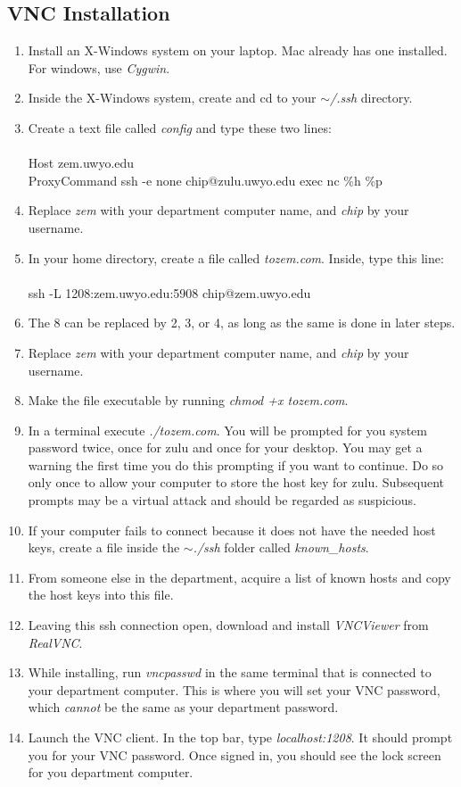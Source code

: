 \documentclass[letterpaper,12pt]{article}
\begin{document}
	\subsection{VNC Installation}
	\begin{enumerate}
		\item Install an X-Windows system on your laptop. Mac already has one installed. For windows, use \textit{Cygwin}.
		\item Inside the X-Windows system, create and cd to your \textit{$\sim$/.ssh} directory.
		\item Create a text file called \textit{config} and type these two lines:\\\\
			Host zem.uwyo.edu\\
			\hspace*{1ex} ProxyCommand ssh -e none chip@zulu.uwyo.edu exec nc \%h \%p
		\item Replace \textit{zem} with your department computer name, and \textit{chip} by your username.
		\item In your home directory, create a file called \textit{tozem.com}. Inside, type this line:\\\\
			ssh -L 1208:zem.uwyo.edu:5908 chip@zem.uwyo.edu

		\item The 8 can be replaced by 2, 3, or 4, as long as the same is done in later steps.
		\item Replace \textit{zem} with your department computer name, and \textit{chip} by your username.
		\item Make the file executable by running \textit{chmod +x tozem.com}.
		\item In a terminal execute \textit{./tozem.com}. You will be prompted for you system password twice, once for zulu and once for your desktop. You may get a warning the first time you do this prompting if you want to continue. Do so only once to allow your computer to store the host key for zulu. Subsequent prompts may be a virtual attack and should be regarded as suspicious.
		\item If your computer fails to connect because it does not have the needed host keys, create a file inside the \textit{$\sim$./ssh} folder called \textit{known\_hosts}.
		\item From someone else in the department, acquire a list of known hosts and copy the host keys into this file.
		\item Leaving this ssh connection open, download and install \textit{VNCViewer} from \textit{RealVNC}.
		\item While installing, run \textit{vncpasswd} in the same terminal that is connected to your department computer. This is where you will set your VNC password, which \textit{cannot} be the same as your department password.
		\item Launch the VNC client. In the top bar, type \textit{localhost:1208}. It should prompt you for your VNC password. Once signed in, you should see the lock screen for you department computer.
	\end{enumerate}
\end{document}

